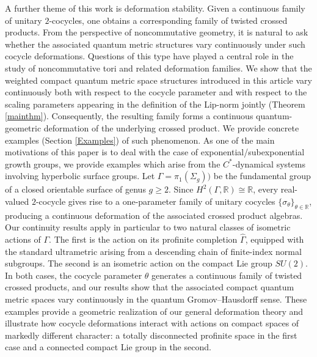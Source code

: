 \documentclass[a4paper,11pt,reqno]{amsart}
\theoremstyle{plain}
\theoremstyle{mainthmstyle}
\theoremstyle{named}
\numberwithin{equation}{section}
\begin{document}
A further theme of this work is deformation stability. Given a continuous family of unitary $2$-cocycles, one obtains a corresponding family of twisted crossed products. From the perspective of noncommutative geometry, it is natural to ask whether the associated quantum metric structures vary continuously under such cocycle deformations. Questions of this type have played a central role in the study of noncommutative tori and related deformation families. We show that the weighted compact quantum metric space structures introduced in this article vary continuously both with respect to the cocycle parameter and with respect to the scaling parameters appearing in the definition of the Lip-norm jointly (Theorem \ref{mainthm}). Consequently, the resulting family forms a continuous quantum-geometric deformation of the underlying crossed product. We provide concrete examples (Section \ref{Examples}) of such phenomenon. As one of the main motivations of this paper is to deal with the case of exponential/subexponential growth groups, we provide examples which arise from the $C^{\ast}$-dynamical systems involving hyperbolic surface groups. Let $\Gamma=\pi_{1}(\Sigma_g))$ be the fundamental group of a closed orientable surface of genus $g\geq 2$. Since $H^{2}(\Gamma,\mathbb{R})\cong \mathbb{R}$, every real-valued $2$-cocycle gives rise to a one-parameter family of unitary cocycles $\{\sigma_{\theta}\}_{\theta\in\mathbb{R}}$, producing a continuous deformation of the associated crossed product algebras. Our continuity results apply in particular to two natural classes of isometric actions of $\Gamma$. The first is the action on its profinite completion $\widehat{\Gamma}$, equipped with the standard ultrametric arising from a descending chain of finite-index normal subgroups. The second is an isometric action on the compact Lie group $SU(2)$. In both cases, the cocycle parameter $\theta$ generates a continuous family of twisted crossed products, and our results show that the associated compact quantum metric spaces vary continuously in the quantum Gromov--Hausdorff sense. These examples provide a geometric realization of our general deformation theory and illustrate how cocycle deformations interact with actions on compact spaces of markedly different character: a totally disconnected profinite space in the first case and a connected compact Lie group in the second. 
\end{document}
